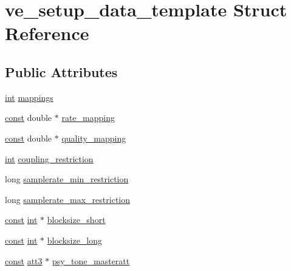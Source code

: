 \hypertarget{structve__setup__data__template}{}\section{ve\+\_\+setup\+\_\+data\+\_\+template Struct Reference}
\label{structve__setup__data__template}
\subsection*{Public Attributes}
\begin{DoxyCompactItemize}
\item 
\hyperlink{xmltok_8h_a5a0d4a5641ce434f1d23533f2b2e6653}{int} \hyperlink{structve__setup__data__template_a1fae0454f1291ca150015e931e19c9c9}{mappings}
\item 
\hyperlink{getopt1_8c_a2c212835823e3c54a8ab6d95c652660e}{const} double $\ast$ \hyperlink{structve__setup__data__template_a7a0d9b35ef99f3fa83223093f7d4d8c3}{rate\+\_\+mapping}
\item 
\hyperlink{getopt1_8c_a2c212835823e3c54a8ab6d95c652660e}{const} double $\ast$ \hyperlink{structve__setup__data__template_ad56fff2e50fc8c8ecb023810a505e067}{quality\+\_\+mapping}
\item 
\hyperlink{xmltok_8h_a5a0d4a5641ce434f1d23533f2b2e6653}{int} \hyperlink{structve__setup__data__template_a19a542524d81938a074503da7b6aeea8}{coupling\+\_\+restriction}
\item 
long \hyperlink{structve__setup__data__template_ae6fea757e163c4adc1474593663cba5b}{samplerate\+\_\+min\+\_\+restriction}
\item 
long \hyperlink{structve__setup__data__template_af5709bcc9b67d6f832f0d25f41615a0c}{samplerate\+\_\+max\+\_\+restriction}
\item 
\hyperlink{getopt1_8c_a2c212835823e3c54a8ab6d95c652660e}{const} \hyperlink{xmltok_8h_a5a0d4a5641ce434f1d23533f2b2e6653}{int} $\ast$ \hyperlink{structve__setup__data__template_a43f266bf64f0c8b6d1b22971a2071546}{blocksize\+\_\+short}
\item 
\hyperlink{getopt1_8c_a2c212835823e3c54a8ab6d95c652660e}{const} \hyperlink{xmltok_8h_a5a0d4a5641ce434f1d23533f2b2e6653}{int} $\ast$ \hyperlink{structve__setup__data__template_afcb7651018dd96fd68f0e6e5acf6fdac}{blocksize\+\_\+long}
\item 
\hyperlink{getopt1_8c_a2c212835823e3c54a8ab6d95c652660e}{const} \hyperlink{structatt3}{att3} $\ast$ \hyperlink{structve__setup__data__template_ab0c56a0e186b5c7f8e0e8d87a901d7e5}{psy\+\_\+tone\+\_\+masteratt}

\end{DoxyCompactItemize}
